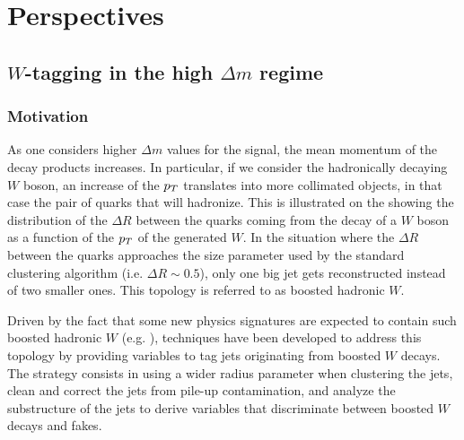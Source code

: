     \section{Perspectives \label{sec:analysis_perspective}}

    \subsection{$W$-tagging in the high $\Delta m$ regime}

    \subsubsection{Motivation}

     As one considers higher $\Delta m$ values for the signal, the mean momentum
     of the decay products increases. In particular, if we consider the
     hadronically decaying $W$ boson, an increase of the $p_T$ translates into
     more collimated objects, in that case the pair of quarks that will
     hadronize. This is illustrated on the
      showing the distribution
     of the $\Delta R$ between the quarks coming from the decay of a $W$ boson
     as a function of the $p_T$ of the generated $W$. In the situation where the
     $\Delta R$ between the quarks approaches the size parameter used by the
     standard clustering algorithm (i.e. $\Delta R \sim 0.5$), only one big jet
     gets reconstructed instead of two smaller ones.  This topology is referred
     to as boosted hadronic $W$.


     Driven by the fact that some new physics signatures are expected to contain
     such boosted hadronic $W$ (e.g. \cite{SUS-12-024}), techniques have been
     developed to address this topology by providing variables to tag jets
     originating from boosted $W$ decays. The strategy consists in using a wider
     radius parameter when clustering the jets, clean and correct the jets from
     pile-up contamination, and analyze the substructure of the jets to derive
     variables that discriminate between boosted $W$ decays and fakes.

